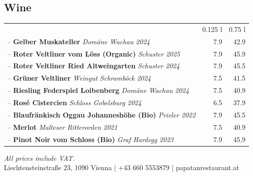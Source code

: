 \documentclass[a4paper,12pt]{article}
\begin{document}
\begin{multicols}{2}
\section*{Wine}
\begin{tabular}{Lrr}
& 0.125 l & 0.75 l\\
-- \textbf{Gelber Muskateller} \emph{Domäne Wachau 2024} & 7.9 & 42.9\\
-- \textbf{Roter Veltliner vom Löss (Organic)} \emph{Schuster 2025} & 7.9 & 45.9\\
-- \textbf{Roter Veltliner Ried Altweingarten} \emph{Schuster 2024} & 7.9 & 45.5\\
-- \textbf{Grüner Veltliner} \emph{Weingut Schramböck 2024} & 7.5 & 41.5\\
-- \textbf{Riesling Federspiel Loibenberg} \emph{Domäne Wachau 2024} & 7.5 & 40.9\\
-- \textbf{Rosé Cistercien} \emph{Schloss Gobelsburg 2024} & 6.5 & 37.9\\
-- \textbf{Blaufränkisch Oggau Johanneshöhe (Bio)} \emph{Prieler 2022} & 7.9 & 45.5\\
-- \textbf{Merlot} \emph{Malteser Ritterorden 2021} & 7.5 & 40.9\\
-- \textbf{Pinot Noir vom Schloss (Bio)} \emph{Graf Hardegg 2023} & 7.9 & 45.9
\end{tabular}

\end{multicols}

\vfill
\begin{center}
    {\small \textit{All prices include VAT.}}\\
    {\small Liechtensteinstraße 23, 1090 Vienna \quad | \quad +43 660 5553879 \quad | \quad papatanrestaurant.at}
\end{center}
\end{document}
